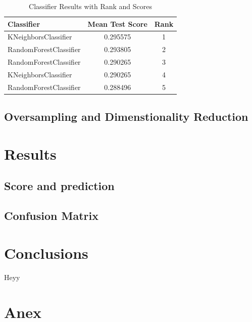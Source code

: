 \documentclass{article}
\begin{document}
\begin{table}[h!]
    \centering
    \caption{Classifier Results with Rank and Scores}
    \label{tab:classifier_ranks}
    \begin{tabular}{lcc}
    \toprule
    \textbf{Classifier}       & \textbf{Mean Test Score} & \textbf{Rank} \\
    \midrule
    KNeighborsClassifier      & 0.295575                & 1 \\
    RandomForestClassifier    & 0.293805                & 2 \\
    RandomForestClassifier    & 0.290265                & 3 \\
    KNeighborsClassifier      & 0.290265                & 4 \\
    RandomForestClassifier    & 0.288496                & 5 \\
    \bottomrule
    \end{tabular}
    \end{table}

\subsection{Oversampling and Dimenstionality Reduction}

\section{Results}

\subsection{Score and prediction}

\subsection{Confusion Matrix}

\section{Conclusions}
Heyy ~\cite{disease_dataset2023}

\section{Anex}


\end{document}
